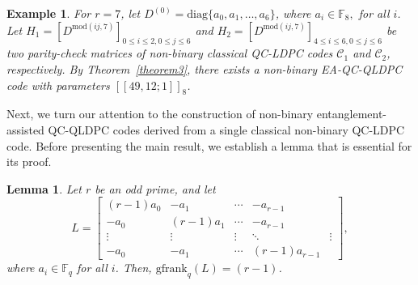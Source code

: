 \documentclass[conference]{IEEEtran}
\newtheorem{lemma}{Lemma}
\newtheorem{example}{Example}
\begin{document}
\begin{example}
  For $r=7$, let $D^{(0)}=\mathrm{diag}\{a_{0},a_{1},\ldots,a_{6}\}$, where $a_{i}\in \mathbb{F}_{8},$ for all $i$. Let $H_{1}= [D^{\mathrm{mod}(ij, 7)}]_{0\leq i\leq 2,0\leq j\leq 6}$ and  $H_{2}=[D^{\mathrm{mod}(ij, 7)}]_{4\leq i\leq 6,0\leq j\leq 6}$
be two parity-check matrices of non-binary classical QC-LDPC codes $\mathcal{C}_{1}$ and $\mathcal{C}_{2}$, respectively. By Theorem~\ref{theorem3}, there exists a non-binary EA-QC-QLDPC code with parameters $[[49,12;1]]_8$.
\end{example}
Next, we turn our attention to the construction of non-binary entanglement-assisted QC-QLDPC codes derived from a single classical non-binary QC-LDPC code. Before presenting the main result, we establish a lemma that is essential for its proof.
\begin{lemma}\label{L}
Let $r$ be an odd prime, and let \begin{equation*}
   L= \begin{bmatrix}
        (r-1)a_{0} & -a_{1}& \cdots & -a_{r-1}\\
        -a_{0} & (r-1)a_{1}& \cdots & -a_{r-1}\\
        \vdots & \vdots&\vdots& \ddots & \vdots\\
         -a_{0} & -a_{1}& \cdots & (r-1)a_{r-1}
    \end{bmatrix},
\end{equation*}  where $a_{i}\in\mathbb{F}_{q}$ for all $i$. Then, $\mathrm{gfrank}_{q}(L) =(r-1)$.
\end{lemma}
\end{document}
